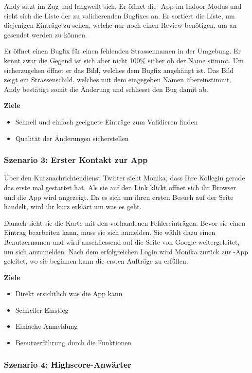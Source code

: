 Andy sitzt im Zug und langweilt sich. Er öffnet die \kort{}-App im Indoor-Modus und sieht sich die Liste der zu validierenden Bugfixes an. Er sortiert die Liste, um diejenigen Einträge zu sehen, welche nur noch einen Review benötigen, um an  gesendet werden zu können.

Er öffnet einen Bugfix für einen fehlenden Strassennamen in der Umgebung. Er kennt zwar die Gegend ist sich aber nicht 100\% sicher ob der Name stimmt. Um sicherzugehen öffnet er das Bild, welches dem Bugfix angehängt ist. Das Bild zeigt ein Strassenschild, welches mit dem eingegeben Namen übereinstimmt. Andy bestätigt somit die Änderung und schliesst den Bug damit ab.

\textbf{Ziele}
\begin{itemize}
\item Schnell und einfach geeignete Einträge zum Validieren finden
\item Qualität der Änderungen sicherstellen
\end{itemize}

\subsubsection{Szenario 3: Erster Kontakt zur App}

Über den Kurznachrichtendienst Twitter sieht Monika, dass Ihre Kollegin gerade das erste mal \kort{} gestartet hat.
Als sie auf den Link klickt öffnet sich ihr Browser und die App wird angezeigt.
Da es sich um ihren ersten Besuch auf der Seite handelt, wird ihr kurz erklärt um was es geht.

Danach sieht sie die Karte mit den vorhandenen Fehlereinträgen.
Bevor sie einen Eintrag bearbeiten kann, muss sie sich anmelden.
Sie wählt dazu einen Benutzernamen und wird anschliessend auf die Seite von Google weitergeleitet, um sich anzumelden.
Nach dem erfolgreichen Login wird Monika zurück zur \kort{}-App geleitet, wo sie beginnen kann die ersten Aufträge zu erfüllen.

\textbf{Ziele}
\begin{itemize}
\item Direkt ersichtlich was die App kann
\item Schneller Einstieg
\item Einfache Anmeldung
\item Benutzerführung durch die Funktionen
\end{itemize}

\subsubsection{Szenario 4: Highscore-Anwärter}

